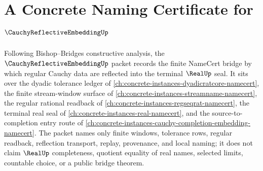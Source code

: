 \chapter{A Concrete Naming Certificate for $\CauchyReflectiveEmbeddingUp$}
\label{ch:concrete-instances-cauchy-reflective-embedding-namecert}

Following Bishop--Bridges constructive analysis, the $\CauchyReflectiveEmbeddingUp$ packet records the finite NameCert bridge by which regular Cauchy data are reflected into the terminal $\RealUp$ seal. It sits over the dyadic tolerance ledger of \autoref{ch:concrete-instances-dyadicratcore-namecert}, the finite stream-window surface of \autoref{ch:concrete-instances-streamname-namecert}, the regular rational readback of \autoref{ch:concrete-instances-regseqrat-namecert}, the terminal real seal of \autoref{ch:concrete-instances-real-namecert}, and the source-to-completion entry route of \autoref{ch:concrete-instances-cauchy-completion-embedding-namecert}. The packet names only finite windows, tolerance rows, regular readback, reflection transport, replay, provenance, and local naming; it does not claim $\RealUp$ completeness, quotient equality of real names, selected limits, countable choice, or a public bridge theorem.

